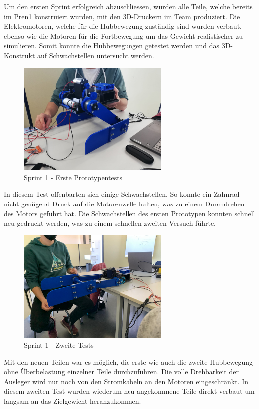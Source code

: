 Um den ersten Sprint erfolgreich abzuschliessen, wurden alle Teile, welche bereits im Pren1 konstruiert wurden, mit den 3D-Druckern im Team produziert. Die Elektromotoren, welche für die Hubbewegung zuständig sind wurden verbaut, ebenso wie die Motoren für die Fortbewegung um das Gewicht realistischer zu simulieren. Somit konnte die Hubbewegungen getestet werden und das 3D-Konstrukt auf Schwachstellen untersucht werden.

\begin{figure}[H]
  \includegraphics[width=0.65\textwidth]{img/Sprint1/pren1_sprint1_1.png}
  \centering
  \caption{Sprint 1 - Erste Prototypentests}
  \label{fig:sprint-backlog-1}
\end{figure}
In diesem Test offenbarten sich einige Schwachstellen. So konnte ein Zahnrad nicht genügend Druck auf die Motorenwelle halten, was zu einem Durchdrehen des Motors geführt hat.
Die Schwachstellen des ersten Prototypen konnten schnell neu gedruckt werden, was zu einem schnellen zweiten Versuch führte.

\begin{figure}[H]
  \includegraphics[width=0.65\textwidth]{img/Sprint1/pren1_sprint1_2.png}
  \centering
  \caption{Sprint 1 - Zweite Tests}
  \label{fig:sprint-backlog-1}
\end{figure}
Mit den neuen Teilen war es möglich, die erste wie auch die zweite Hubbewegung ohne Überbelastung einzelner Teile durchzuführen.
Die volle Drehbarkeit der Ausleger wird nur noch von den Stromkabeln an den Motoren eingeschränkt. In diesem zweiten Test wurden wiederum neu angekommene Teile direkt verbaut um langsam an das Zielgewicht heranzukommen.

